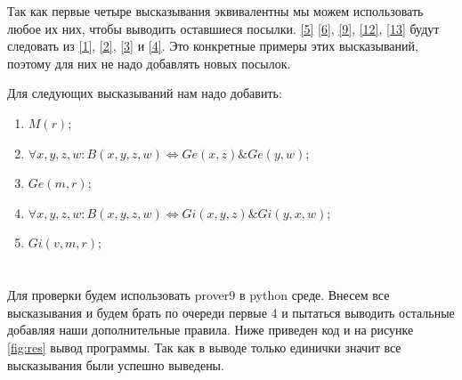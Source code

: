 \documentclass[a4paper,14pt]{article} %
\begin{document}
Так как первые четыре высказывания эквивалентны мы можем использовать любое их них, 
чтобы выводить оставшиеся посылки. \ref{5} \ref{6}, \ref{9}, \ref{12}, \ref{13} будут 
следовать из \ref{1}, \ref{2}, \ref{3} и \ref{4}. 
Это конкретные примеры этих высказываний, поэтому для них не надо добавлять новых посылок.

Для следующих высказываний нам надо добавить:
\begin{enumerate}
    \item $M(r)$;
    \item $\forall x,y,z,w: B(x, y, z, w) \Leftrightarrow Ge(x, z) \& Ge(y, w)$;
    \item $Ge(m, r)$;
    \item $\forall x,y,z,w: B(x, y, z, w) \Leftrightarrow Gi(x, y, z) \& Gi(y, x, w)$; 
    \item $Gi(v, m, r)$;
\end{enumerate}

\section{}
Для проверки будем использовать prover9 в python среде. 
Внесем все высказывания и будем брать по очереди первые 4 и 
пытаться выводить остальные добавляя наши дополнительные правила.
Ниже приведен код и на рисунке \ref{fig:res} вывод программы.
Так как в выводе только единички значит все высказывания были успешно выведены.
\end{document}

